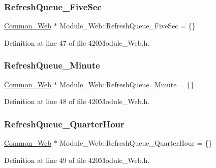 \subsubsection{\texorpdfstring{Refresh\+Queue\+\_\+\+Five\+Sec}{RefreshQueue\_FiveSec}}
{\footnotesize\ttfamily \hyperlink{class_common___web}{Common\+\_\+\+Web} $\ast$ Module\+\_\+\+Web\+::\+Refresh\+Queue\+\_\+\+Five\+Sec = \{\}\hspace{0.3cm}{\ttfamily [protected]}}



Definition at line 47 of file 420\+Module\+\_\+\+Web.\+h.

\mbox{\label{class_module___web_ac002b8dc45aa65394953d28a0f8020ee}} 
\subsubsection{\texorpdfstring{Refresh\+Queue\+\_\+\+Minute}{RefreshQueue\_Minute}}
{\footnotesize\ttfamily \hyperlink{class_common___web}{Common\+\_\+\+Web} $\ast$ Module\+\_\+\+Web\+::\+Refresh\+Queue\+\_\+\+Minute = \{\}\hspace{0.3cm}{\ttfamily [protected]}}



Definition at line 48 of file 420\+Module\+\_\+\+Web.\+h.

\mbox{\label{class_module___web_ae93c875964516f3c050e1de917b3045f}} 
\subsubsection{\texorpdfstring{Refresh\+Queue\+\_\+\+Quarter\+Hour}{RefreshQueue\_QuarterHour}}
{\footnotesize\ttfamily \hyperlink{class_common___web}{Common\+\_\+\+Web} $\ast$ Module\+\_\+\+Web\+::\+Refresh\+Queue\+\_\+\+Quarter\+Hour = \{\}\hspace{0.3cm}{\ttfamily [protected]}}



Definition at line 49 of file 420\+Module\+\_\+\+Web.\+h.

